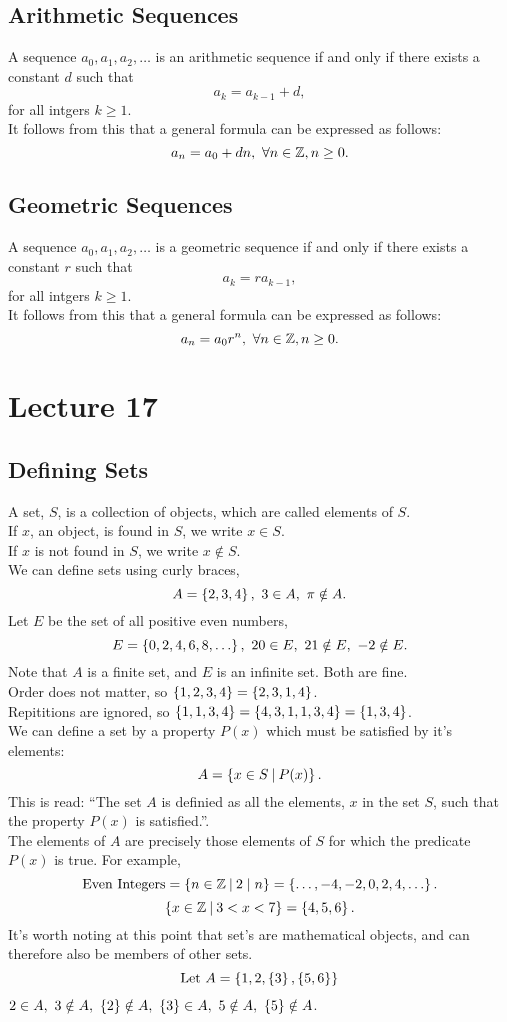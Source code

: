 \documentclass{report}
\begin{document}
\subsection*{Arithmetic Sequences}
A sequence $a_0, a_1, a_2, \dots$ is an arithmetic sequence if and only if there exists a constant $d$ such that
$$ a_k = a_{k-1} + d, $$
for all intgers $k\geq1$. \\
It follows from this that a general formula can be expressed as follows: 
$$ a_n = a_0 + dn,\ \forall n\in\mathbb{Z},n\geq0. $$

\subsection*{Geometric Sequences}
A sequence $a_0, a_1, a_2, \dots$ is a geometric sequence if and only if there exists a constant $r$ such that 
$$ a_k = ra_{k-1}, $$
for all intgers $k\geq1$. \\
It follows from this that a general formula can be expressed as follows:
$$ a_n = a_0r^n,\ \forall n\in\mathbb{Z},n\geq0. $$

\section{Lecture 17}
\subsection*{Defining Sets}
A set, $S$, is a collection of objects, which are called elements of $S$. \\
If $x$, an object, is found in $S$, we write $x\in S$. \\
If $x$ is not found in $S$, we write $x\notin S$. \\

We can define sets using curly braces, 
$$
	A = \left\lbrace 2, 3, 4 \right\rbrace,\ 3\in A,\ \pi\notin A.
$$
Let $E$ be the set of all positive even numbers,
$$
	E = \braces{0, 2, 4, 6, 8, \dots},\ 20\in E,\ 21\notin E,\ -2\notin E.
$$
Note that $A$ is a finite set, and $E$ is an infinite set. Both are fine. \\

Order does not matter, so $\left\lbrace 1, 2, 3, 4 \right\rbrace = \left\lbrace 2, 3, 1, 4 \right\rbrace$. \\
Repititions are ignored, so $\left\lbrace 1, 1, 3, 4 \right\rbrace = \left\lbrace 4, 3, 1, 1, 3, 4 \right\rbrace = \left\lbrace 1, 3, 4 \right\rbrace$. \\

We can define a set by a property $P(x)$ which must be satisfied by it's elements:
$$
	A = \left\lbrace x\in S \medspace\middle|\medspace P(x) \right\rbrace.
$$
This is read: ``The set $A$ is definied as all the elements, $x$ in the set $S$, such that the property $P(x)$ is satisfied.''. \\
The elements of $A$ are precisely those elements of $S$ for which the predicate $P(x)$ is true. For example,
$$
	\text{Even Integers} = \braces{n\in\bbz\suchthat 2\divs n} = \braces{\dots, -4, -2, 0, 2, 4, \dots}.
$$
$$
	\left\lbrace x\in\mathbb{Z}\medspace\middle|\medspace 3 < x < 7 \right\rbrace = \left\lbrace 4, 5, 6 \right\rbrace.
$$
It's worth noting at this point that set's are mathematical objects, and can therefore also be members of other sets.
$$
	\text{Let } A = \left\lbrace 1, 2, \left\lbrace 3 \right\rbrace, \left\lbrace 5,6 \right\rbrace \right\rbrace
$$
$2\in A,\ 3\notin A,\ \braces{2}\notin A,\ \braces{3}\in A,\ 5\notin A,\ \braces{5}\notin A$.
\end{document}
